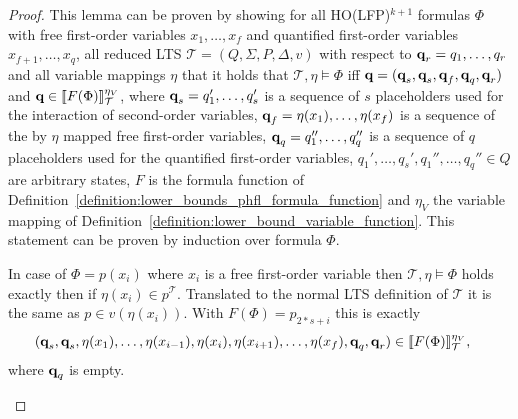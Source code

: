 \begin{proof}
    This lemma can be proven by showing for all HO(LFP)$^{k+1}$ formulas $\Phi$ with free first-order variables $x_1,
    \dots, x_f$ and quantified first-order variables $x_{f+1}, \dots, x_q$, all reduced LTS $\mathcal{T} = (Q, \Sigma, P,
    \Delta, v)$ with respect to $\emph{q}_r = q_1, \dots, q_r$ and all variable mappings $\eta$ that it holds that $\mathcal{T}, \eta \models \Phi$ iff $\emph{q} =
    (\emph{q}_s, \emph{q}_s, \emph{q}_f, \emph{q}_q, \emph{q}_r)$ and $\emph{q} \in \llbracket
   F(\Phi)\rrbracket^{\eta_V}_{\mathcal{T}}$, where $\emph{q}_s = q_1',\dots,q_s'$ is a sequence of $s$ placeholders used for the interaction of second-order variables, $\emph{q}_f = \eta(x_1), \dots, \eta(x_f)$ is a sequence of the by $\eta$ mapped free first-order variables, $\emph{q}_q = q_1'', \dots, q_q''$ is a sequence of $q$ placeholders used for the quantified first-order variables, $q_1', \dots, q_s', q_1'', \dots, q_q'' \in Q$ are arbitrary states, $F$ is the formula function of
    Definition~\ref{definition:lower_bounds_phfl_formula_function} and $\eta_V$ the variable mapping of
    Definition~\ref{definition:lower_bound_variable_function}. This statement can be proven by induction over formula
    $\Phi$.
    \begin{compactitem}
        \item In case of $\Phi = p(x_i)$ where $x_i$ is a free first-order variable then $\mathcal{T}, \eta \models \Phi$ holds exactly then if $\eta(x_i) \in
        p^\mathcal{T}$. Translated to the normal LTS definition of $\mathcal{T}$ it is the same as $p \in v(\eta(x_i))$.
        With $F(\Phi) = p_{2*s+i}$ this is exactly
        \begin{align*}
            (\emph{q}_s, \emph{q}_s, \eta(x_1),& \dots, \eta(x_{i-1}), \eta(x_{i}), \eta(x_{i+1}), \dots, \eta(x_f), \emph{q}_q, \emph{q}_r) \in
            \llbracket F(\Phi) \rrbracket^{\eta_V}_\mathcal{T},
        \end{align*}
        where $\emph{q}_q$ is empty.
        

\end{compactitem}
\end{proof}
